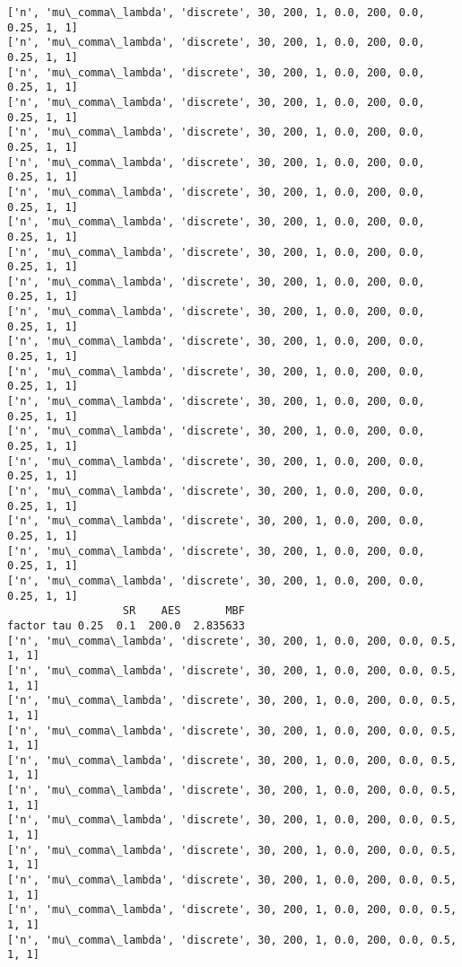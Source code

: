 \documentclass[11pt]{article}
\begin{document}
    \begin{Verbatim}[commandchars=\\\{\}]
['n', 'mu\_comma\_lambda', 'discrete', 30, 200, 1, 0.0, 200, 0.0, 0.25, 1, 1]
['n', 'mu\_comma\_lambda', 'discrete', 30, 200, 1, 0.0, 200, 0.0, 0.25, 1, 1]
['n', 'mu\_comma\_lambda', 'discrete', 30, 200, 1, 0.0, 200, 0.0, 0.25, 1, 1]
['n', 'mu\_comma\_lambda', 'discrete', 30, 200, 1, 0.0, 200, 0.0, 0.25, 1, 1]
['n', 'mu\_comma\_lambda', 'discrete', 30, 200, 1, 0.0, 200, 0.0, 0.25, 1, 1]
['n', 'mu\_comma\_lambda', 'discrete', 30, 200, 1, 0.0, 200, 0.0, 0.25, 1, 1]
['n', 'mu\_comma\_lambda', 'discrete', 30, 200, 1, 0.0, 200, 0.0, 0.25, 1, 1]
['n', 'mu\_comma\_lambda', 'discrete', 30, 200, 1, 0.0, 200, 0.0, 0.25, 1, 1]
['n', 'mu\_comma\_lambda', 'discrete', 30, 200, 1, 0.0, 200, 0.0, 0.25, 1, 1]
['n', 'mu\_comma\_lambda', 'discrete', 30, 200, 1, 0.0, 200, 0.0, 0.25, 1, 1]
['n', 'mu\_comma\_lambda', 'discrete', 30, 200, 1, 0.0, 200, 0.0, 0.25, 1, 1]
['n', 'mu\_comma\_lambda', 'discrete', 30, 200, 1, 0.0, 200, 0.0, 0.25, 1, 1]
['n', 'mu\_comma\_lambda', 'discrete', 30, 200, 1, 0.0, 200, 0.0, 0.25, 1, 1]
['n', 'mu\_comma\_lambda', 'discrete', 30, 200, 1, 0.0, 200, 0.0, 0.25, 1, 1]
['n', 'mu\_comma\_lambda', 'discrete', 30, 200, 1, 0.0, 200, 0.0, 0.25, 1, 1]
['n', 'mu\_comma\_lambda', 'discrete', 30, 200, 1, 0.0, 200, 0.0, 0.25, 1, 1]
['n', 'mu\_comma\_lambda', 'discrete', 30, 200, 1, 0.0, 200, 0.0, 0.25, 1, 1]
['n', 'mu\_comma\_lambda', 'discrete', 30, 200, 1, 0.0, 200, 0.0, 0.25, 1, 1]
['n', 'mu\_comma\_lambda', 'discrete', 30, 200, 1, 0.0, 200, 0.0, 0.25, 1, 1]
['n', 'mu\_comma\_lambda', 'discrete', 30, 200, 1, 0.0, 200, 0.0, 0.25, 1, 1]
                  SR    AES       MBF
factor tau 0.25  0.1  200.0  2.835633
['n', 'mu\_comma\_lambda', 'discrete', 30, 200, 1, 0.0, 200, 0.0, 0.5, 1, 1]
['n', 'mu\_comma\_lambda', 'discrete', 30, 200, 1, 0.0, 200, 0.0, 0.5, 1, 1]
['n', 'mu\_comma\_lambda', 'discrete', 30, 200, 1, 0.0, 200, 0.0, 0.5, 1, 1]
['n', 'mu\_comma\_lambda', 'discrete', 30, 200, 1, 0.0, 200, 0.0, 0.5, 1, 1]
['n', 'mu\_comma\_lambda', 'discrete', 30, 200, 1, 0.0, 200, 0.0, 0.5, 1, 1]
['n', 'mu\_comma\_lambda', 'discrete', 30, 200, 1, 0.0, 200, 0.0, 0.5, 1, 1]
['n', 'mu\_comma\_lambda', 'discrete', 30, 200, 1, 0.0, 200, 0.0, 0.5, 1, 1]
['n', 'mu\_comma\_lambda', 'discrete', 30, 200, 1, 0.0, 200, 0.0, 0.5, 1, 1]
['n', 'mu\_comma\_lambda', 'discrete', 30, 200, 1, 0.0, 200, 0.0, 0.5, 1, 1]
['n', 'mu\_comma\_lambda', 'discrete', 30, 200, 1, 0.0, 200, 0.0, 0.5, 1, 1]
['n', 'mu\_comma\_lambda', 'discrete', 30, 200, 1, 0.0, 200, 0.0, 0.5, 1, 1]

\end{Verbatim}
\end{document}
